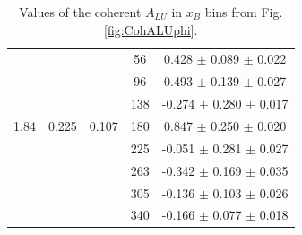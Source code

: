 \documentclass[aps,prc,preprint,superscriptaddress]{revtex4}
\begin{document}
\begin{table}[!h]
\begin{center}
\begin{tabular}{|c|c|c|c|c|}
        &       &       &  56   &  0.428  $\pm$ 0.089  $\pm$ 0.022  \\
        &       &       &  96   &  0.493  $\pm$ 0.139  $\pm$ 0.027  \\
        &       &       & 138   & -0.274  $\pm$ 0.280  $\pm$ 0.017  \\
  1.84  & 0.225 & 0.107 & 180   &  0.847  $\pm$ 0.250  $\pm$ 0.020  \\
        &       &       & 225   & -0.051  $\pm$ 0.281  $\pm$ 0.027  \\
        &       &       & 263   & -0.342  $\pm$ 0.169  $\pm$ 0.035  \\
        &       &       & 305   & -0.136  $\pm$ 0.103  $\pm$ 0.026  \\
        &       &       & 340   & -0.166  $\pm$ 0.077  $\pm$ 0.018  \\
         \hline
      \end{tabular}
      \caption{Values of the coherent $A_{LU}$ in $x_B$ bins from Fig. \ref{fig:CohALUphi}.}
      \label{table:Coh_xB_BSA}
   \end{center}
\end{table}                        
\end{document}
